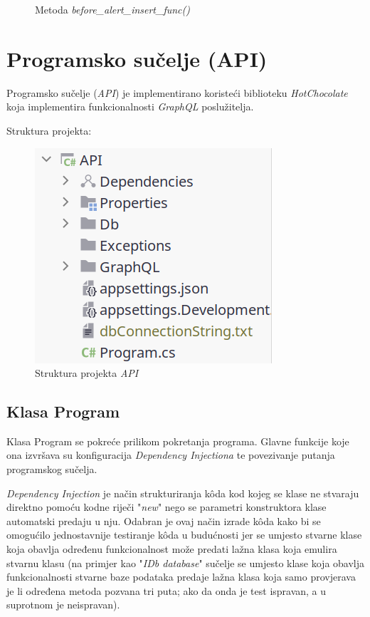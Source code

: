 \documentclass[zavrsnirad]{fer}
\begin{document}
\begin{figure}[htb]
	\centering
	
	\caption{Metoda \textit{before\_alert\_insert\_func()}}
\end{figure}
\FloatBarrier

\section{Programsko sučelje (API)}
Programsko sučelje (\textit{API}) je implementirano koristeći biblioteku \textit{HotChocolate} koja implementira funkcionalnosti \textit{GraphQL} poslužitelja.

Struktura projekta:
\begin{figure}[htb]
	\centering
	\includegraphics[width=0.4\linewidth]{images/api_structure.png} 
	\caption{Struktura projekta \textit{API}}
	\label{slk:api_structure}
\end{figure}
\FloatBarrier

\subsection{Klasa Program}
Klasa Program se pokreće prilikom pokretanja programa. Glavne funkcije koje ona izvršava su konfiguracija \textit{Dependency Injectiona} te povezivanje putanja programskog sučelja.

\textit{Dependency Injection} je način strukturiranja kôda kod kojeg se klase ne stvaraju direktno pomoću kodne riječi "\textit{new}" nego se parametri konstruktora klase automatski predaju u nju. Odabran je ovaj način izrade kôda kako bi se omogućilo jednostavnije testiranje kôda u budućnosti jer se umjesto stvarne klase koja obavlja određenu funkcionalnost može predati lažna klasa koja emulira stvarnu klasu (na primjer kao "\textit{IDb database}" sučelje se umjesto klase koja obavlja funkcionalnosti stvarne baze podataka predaje lažna klasa koja samo provjerava je li određena metoda pozvana tri puta; ako da onda je test ispravan, a u suprotnom je neispravan).
\end{document}
